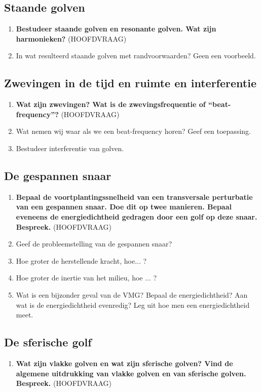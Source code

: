 \documentclass[12pt]{article}
\begin{document}
    \subsection{Staande golven}
    \begin{enumerate}
        \item \textbf{Bestudeer staande golven en resonante golven.  Wat zijn harmonieken?} (HOOFDVRAAG)
        \item In wat resulteerd staande golven met randvoorwaarden? Geen een voorbeeld.
    \end{enumerate}
    \subsection{Zwevingen in de tijd en ruimte en interferentie}
    \begin{enumerate}
        \item \textbf{Wat zijn zwevingen? Wat is de zwevingsfrequentie of “beat-frequency”?} (HOOFDVRAAG)
        \item Wat nemen wij waar als we een beat-frequency horen? Geef een toepassing.
        \item Bestudeer interferentie van golven.
    \end{enumerate}
    \subsection{De gespannen snaar}
    \begin{enumerate}
        \item \textbf{Bepaal de voortplantingssnelheid van een transversale perturbatie van een gespannen snaar. Doe dit op twee manieren. Bepaal eveneens de energiedichtheid gedragen door een golf op deze snaar. Bespreek.} (HOOFDVRAAG)
        \item Geef de probleemstelling van de gespannen snaar?
        \item Hoe groter de herstellende kracht, hoe... ?
        \item Hoe groter de inertie van het milieu, hoe ... ?
        \item Wat is een bijzonder geval van de VMG? Bepaal de energiedichtheid? Aan wat is de energiedichtheid evenredig? Leg uit hoe men een energiedichtheid meet.
    \end{enumerate}
    \subsection{De sferische golf}
    \begin{enumerate}
        \item \textbf{Wat zijn vlakke golven en wat zijn sferische golven? Vind de algemene uitdrukking van vlakke golven en van sferische golven. Bespreek.} (HOOFDVRAAG)
    \end{enumerate}
\end{document}
